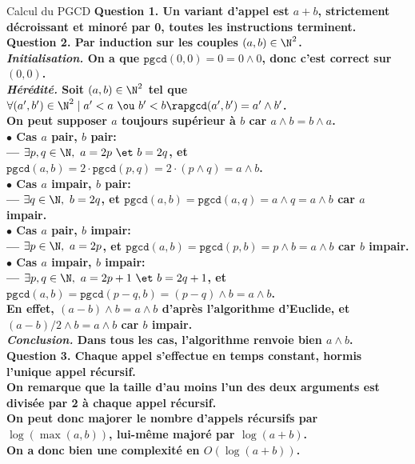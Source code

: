 \documentclass[french, 11pt]{article}
\begin{document}


\thispagestyle{fancy}

\begin{exercice}{Calcul du PGCD}{}
    \bf{Question 1.} Un variant d'appel est $a+b$, strictement décroissant et minoré par 0, toutes les instructions terminent.\\
    \bf{Question 2.} Par induction sur les couples $(a,b)\in\N^2$.\\
    \emph{Initialisation.} On a que $\texttt{pgcd}(0,0)=0=0\land 0$, donc c'est correct sur $(0,0)$.\\
    \emph{Hérédité.} Soit $(a,b)\in\N^2$ tel que $\forall (a',b')\in\N^2 \mid a' < a ~\ou~ b' < b \ra \texttt{pgcd}(a',b')=a'\land b'$.\\
    On peut supposer $a$ toujours supérieur à $b$ car $a\land b=b\land a$.\\
    $\bullet$ Cas $a$ pair, $b$ pair:\\
    --- $\exists p,q\in\N, ~ a=2p ~\et~ b=2q$, et $\texttt{pgcd}(a,b)=2\cdot\texttt{pgcd}(p,q)=2\cdot(p\land q)=a\land b$.\\
    $\bullet$ Cas $a$ impair, $b$ pair:\\
    --- $\exists q\in\N, ~ b=2q$, et $\texttt{pgcd}(a,b)=\texttt{pgcd}(a,q)=a\land q=a\land b$ car $a$ impair.\\
    $\bullet$ Cas $a$ pair, $b$ impair:\\
    --- $\exists p\in\N, ~ a=2p$, et $\texttt{pgcd}(a,b)=\texttt{pgcd}(p,b)=p\land b=a\land b$ car $b$ impair.\\
    $\bullet$ Cas $a$ impair, $b$ impair:\\
    --- $\exists p,q\in\N, ~ a=2p+1 ~\et~ b=2q+1$, et $\texttt{pgcd}(a,b)=\texttt{pgcd}(p-q,b)=(p-q)\land b=a\land b$.\\
    En effet, $(a-b)\land b = a\land b$ d'après l'algorithme d'Euclide, et $(a-b)/2\land b=a\land b$ car $b$ impair.\\
    \emph{Conclusion.} Dans tous les cas, l'algorithme renvoie bien $a\land b$.\\
    \bf{Question 3.} Chaque appel s'effectue en temps constant, hormis l'unique appel récursif.\\
    On remarque que la taille d'au moins l'un des deux arguments est divisée par 2 à chaque appel récursif.\\
    On peut donc majorer le nombre d'appels récursifs par $\log(\max(a,b))$, lui-même majoré par $\log(a+b)$.\\
    On a donc bien une complexité en $O(\log(a+b))$.
\end{exercice}
\end{document}
